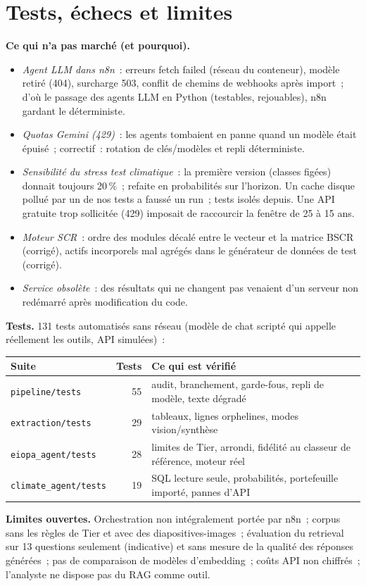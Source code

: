 \documentclass[11pt,a4paper]{article}
\newcommand{\code}[1]{\texttt{\small #1}}
\begin{document}
\section{Tests, \'echecs et limites}\label{sec:echecs}
\textbf{Ce qui n'a pas march\'e (et pourquoi).}
\begin{itemize}
\item \emph{Agent LLM dans n8n}~: erreurs \og fetch failed\fg{} (r\'eseau du conteneur), mod\`ele retir\'e (404), surcharge 503, conflit de chemins de webhooks apr\`es import~; d'o\`u le passage des agents LLM en Python (testables, rejouables), n8n gardant le d\'eterministe.
\item \emph{Quotas Gemini (429)}~: les agents tombaient en panne quand un mod\`ele \'etait \'epuis\'e~; correctif~: rotation de cl\'es/mod\`eles et repli d\'eterministe.
\item \emph{Sensibilit\'e du stress test climatique}~: la premi\`ere version (classes figées) donnait toujours 20\,\%~; refaite en probabilit\'es sur l'horizon. Un cache disque pollu\'e par un de nos tests a faussé un run~; tests isol\'es depuis. Une API gratuite trop sollicit\'ee (429) imposait de raccourcir la fen\^etre de 25 \`a 15 ans.
\item \emph{Moteur SCR}~: ordre des modules d\'ecal\'e entre le vecteur et la matrice BSCR (corrig\'e), actifs incorporels mal agr\'eg\'es dans le g\'en\'erateur de donn\'ees de test (corrig\'e).
\item \emph{Service obsol\`ete}~: des r\'esultats \og qui ne changent pas\fg{} venaient d'un serveur non red\'emarr\'e apr\`es modification du code.
\end{itemize}
\textbf{Tests.} 131 tests automatis\'es sans r\'eseau (mod\`ele de chat scripté qui appelle r\'eellement les outils, API simul\'ees)~:
\begin{center}\small\begin{tabular}{@{}lrl@{}}\toprule
\textbf{Suite} & \textbf{Tests} & \textbf{Ce qui est v\'erifi\'e}\\\midrule
\code{pipeline/tests} & 55 & audit, branchement, garde-fous, repli de mod\`ele, texte d\'egrad\'e\\
\code{extraction/tests} & 29 & tableaux, lignes orphelines, modes vision/synth\`ese\\
\code{eiopa\_agent/tests} & 28 & limites de Tier, arrondi, fid\'elit\'e au classeur de r\'ef\'erence, moteur r\'eel\\
\code{climate\_agent/tests} & 19 & SQL lecture seule, probabilit\'es, portefeuille import\'e, pannes d'API\\\bottomrule
\end{tabular}\end{center}
\textbf{Limites ouvertes.} Orchestration non int\'egralement port\'ee par n8n~; corpus sans les r\`egles de Tier et avec des diapositives-images~; \'evaluation du retrieval sur 13 questions seulement (indicative) et sans mesure de la qualit\'e des r\'eponses g\'en\'er\'ees~; pas de comparaison de mod\`eles d'embedding~; co\^uts API non chiffr\'es~; l'analyste ne dispose pas du RAG comme outil.
\end{document}
